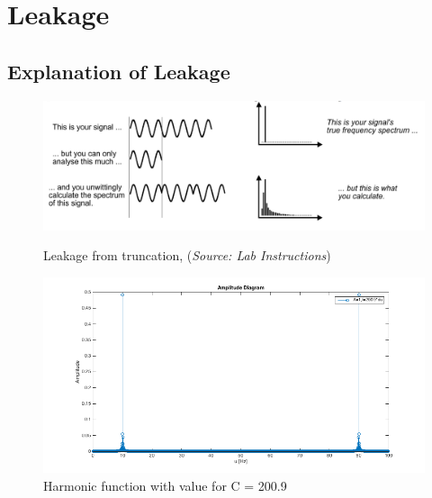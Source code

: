 \documentclass[12pt]{article}
\begin{document}
\section{Leakage}

%

\subsection{Explanation of Leakage}
\begin{figure}[!htbp]
  \centering
  \begin{minipage}[b]{0.9\textwidth}
    \includegraphics[width=\textwidth]{images/figure_straddleloss}
    \caption{Leakage from truncation, (\textit{Source: Lab Instructions})}
    \label{fig:leakExplain}
  \end{minipage}
  \vfill
  \begin{minipage}[b]{0.9\textwidth}
    \includegraphics[width=\textwidth]{images/ass1_5}
    \caption{Harmonic function with value for C = 200.9}
    \label{fig:leak}
  \end{minipage}
\end{figure}
\end{document}
